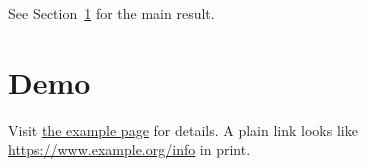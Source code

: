 \documentclass{article}
\begin{document}
See Section~\ref{sec:demo} for the main result.
\section{Demo}\label{sec:demo}
Visit \href{https://www.example.com/some/page}{the example page} for details.
A plain link looks like \url{https://www.example.org/info} in print.
\end{document}
